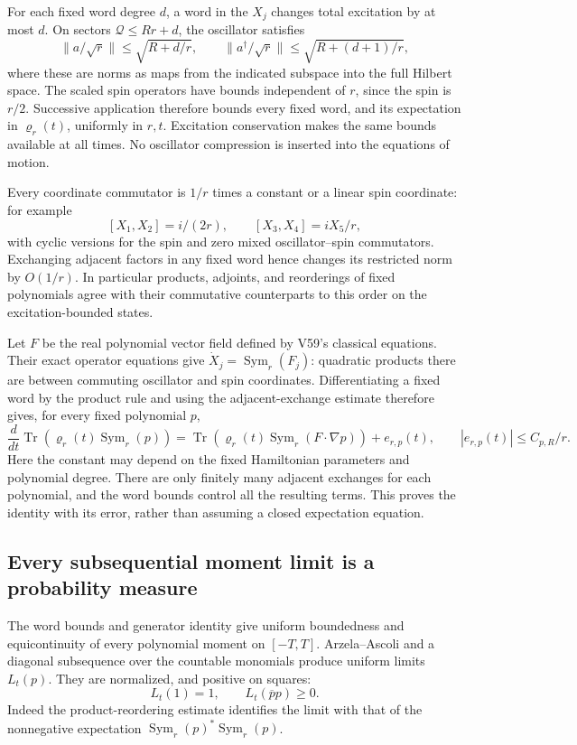 \documentclass[11pt]{article}
\theoremstyle{remark}
\begin{document}
For each fixed word degree \(d\), a word in the \(X_j\)
changes total excitation by at most \(d\).  On sectors
\(\mathcal Q\leq Rr+d\), the oscillator satisfies
\[
 \|a/\sqrt r\|\leq\sqrt{R+d/r},\qquad
 \|a^\dagger/\sqrt r\|\leq\sqrt{R+(d+1)/r},
\]
where these are norms as maps from the indicated subspace
into the full Hilbert space.  The scaled spin operators
have bounds independent of \(r\), since the spin is \(r/2\).
Successive application therefore bounds every fixed word,
and its expectation in \(\varrho_r(t)\), uniformly in \(r,t\).
Excitation conservation makes the same bounds available
at all times.  No oscillator compression is inserted into
the equations of motion.

Every coordinate commutator is \(1/r\) times a constant
or a linear spin coordinate: for example
\[
 [X_1,X_2]=i/(2r),\qquad [X_3,X_4]=iX_5/r,
\]
with cyclic versions for the spin and zero mixed
oscillator--spin commutators.
Exchanging adjacent factors in any fixed word hence changes
its restricted norm by \(O(1/r)\).  In particular products,
adjoints, and reorderings of fixed polynomials agree with
their commutative counterparts to this order on the
excitation-bounded states.

Let \(F\) be the real polynomial vector field defined by
V59's classical equations.  Their exact operator equations
give \(\dot X_j=\operatorname{Sym}_r(F_j)\): quadratic
products there are between commuting oscillator and
spin coordinates.  Differentiating a fixed word by the
product rule and using the adjacent-exchange estimate
therefore gives, for every fixed polynomial \(p\),
\[
 \frac{d}{dt}\operatorname{Tr}
      (\varrho_r(t)\operatorname{Sym}_r(p))
 =\operatorname{Tr}
      (\varrho_r(t)\operatorname{Sym}_r(F\cdot\nabla p))
      +e_{r,p}(t),\qquad
 |e_{r,p}(t)|\leq C_{p,R}/r .
\]
Here the constant may depend on the fixed Hamiltonian
parameters and polynomial degree.  There are only
finitely many adjacent exchanges for each polynomial,
and the word bounds control all the resulting terms.
This proves the identity with its error, rather than
assuming a closed expectation equation.

\subsection{Every subsequential moment limit is a probability measure}

The word bounds and generator identity give uniform
boundedness and equicontinuity of every polynomial moment
on \([-T,T]\).  Arzela--Ascoli and a diagonal subsequence
over the countable monomials produce uniform limits
\(L_t(p)\).  They are normalized, and positive on squares:
\[
 L_t(1)=1,\qquad L_t(\overline p p)\geq0 .
\]
Indeed the product-reordering estimate identifies the
limit with that of the nonnegative expectation
\(\operatorname{Sym}_r(p)^*\operatorname{Sym}_r(p)\).
\end{document}
